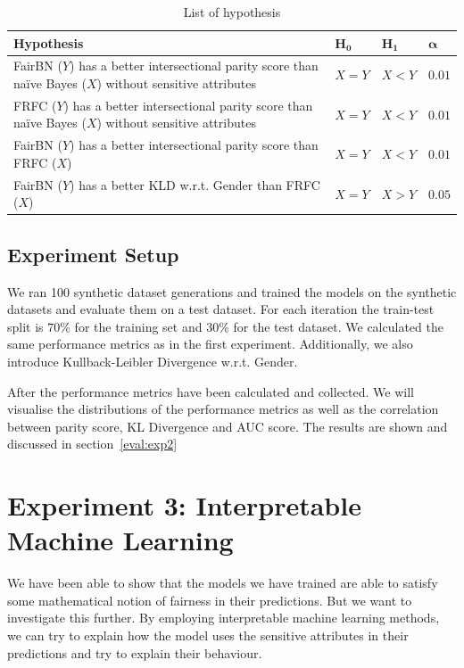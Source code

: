 \begin{table}
    \centering
    \begin{tabular}{p{10cm}lll}
        \hline
        \textbf{Hypothesis} & $\boldsymbol{H_0}$ & $\boldsymbol{H_1}$ & $\boldsymbol{\alpha}$ \\
        \hline
        \hline
        FairBN ($Y$) has a better intersectional parity score than naïve Bayes ($X$) without sensitive attributes & $X = Y$ & $X < Y$ & $0.01$ \\ \hline
        FRFC ($Y$) has a better intersectional parity score than naïve Bayes ($X$) without sensitive attributes & $X = Y$ & $X < Y$ & $0.01$ \\ \hline
        FairBN ($Y$) has a better intersectional parity score than FRFC ($X$) & $X = Y$ & $X < Y$ & $0.01$ \\ \hline
        FairBN ($Y$) has a better KLD w.r.t. Gender than FRFC ($X$) & $X = Y$ & $X > Y$ & $0.05$ \\ \hline
    \end{tabular}
    \caption{List of hypothesis}
    \label{tab:hypothesis}
\end{table}

\subsection{Experiment Setup}

We ran 100 synthetic dataset generations and trained the models on the synthetic datasets and evaluate them on a test dataset. For each iteration the train-test split is $70\%$ for the training set and $30\%$ for the test dataset. We calculated the same performance metrics as in the first experiment. Additionally, we also introduce Kullback-Leibler Divergence w.r.t. Gender. 

After the performance metrics have been calculated and collected. We will visualise the distributions of the performance metrics as well as the correlation between parity score, KL Divergence and AUC score. The results are shown and discussed in section~\ref{eval:exp2}

\section{Experiment 3: Interpretable Machine Learning}

We have been able to show that the models we have trained are able to satisfy some mathematical notion of fairness in their predictions. But we want to investigate this further. By employing interpretable machine learning methods, we can try to explain how the model uses the sensitive attributes in their predictions and try to explain their behaviour. 

